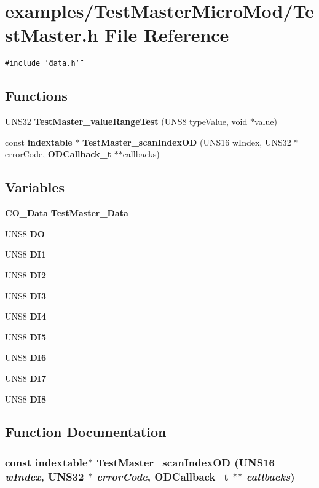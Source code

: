 \section{examples/Test\-Master\-Micro\-Mod/Test\-Master.h File Reference}
\label{TestMasterMicroMod_2TestMaster_8h}
{\tt \#include \char`\"{}data.h\char`\"{}}\par
\subsection*{Functions}
\begin{CompactItemize}
\item 
UNS32 {\bf Test\-Master\_\-value\-Range\-Test} (UNS8 type\-Value, void $\ast$value)
\item 
const {\bf indextable} $\ast$ {\bf Test\-Master\_\-scan\-Index\-OD} (UNS16 w\-Index, UNS32 $\ast$error\-Code, {\bf ODCallback\_\-t} $\ast$$\ast$callbacks)
\end{CompactItemize}
\subsection*{Variables}
\begin{CompactItemize}
\item 
{\bf CO\_\-Data} {\bf Test\-Master\_\-Data}
\item 
UNS8 {\bf DO}
\item 
UNS8 {\bf DI1}
\item 
UNS8 {\bf DI2}
\item 
UNS8 {\bf DI3}
\item 
UNS8 {\bf DI4}
\item 
UNS8 {\bf DI5}
\item 
UNS8 {\bf DI6}
\item 
UNS8 {\bf DI7}
\item 
UNS8 {\bf DI8}
\end{CompactItemize}


\subsection{Function Documentation}
\subsubsection{\setlength{\rightskip}{0pt plus 5cm}const {\bf indextable}$\ast$ Test\-Master\_\-scan\-Index\-OD (UNS16 {\em w\-Index}, UNS32 $\ast$ {\em error\-Code}, {\bf ODCallback\_\-t} $\ast$$\ast$ {\em callbacks})}\label{TestMasterMicroMod_2TestMaster_8h_6d2aa48880a24b9e8daaeb34fa36f820}


